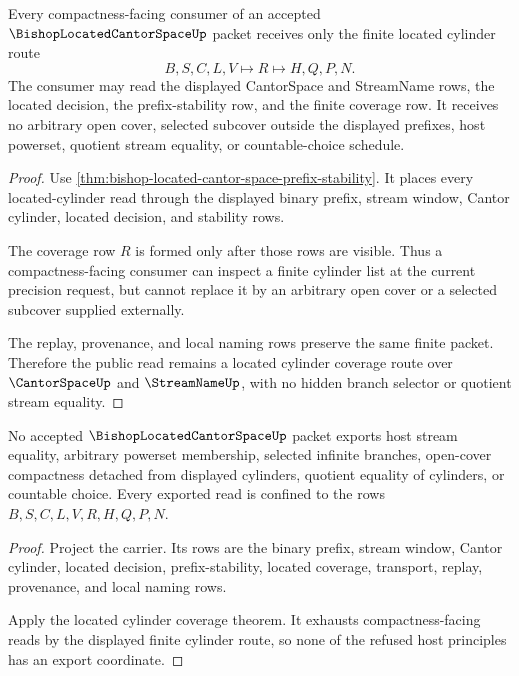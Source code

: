 \begin{theorem}
\label{thm:bishop-located-cantor-space-cylinder-coverage}
Every compactness-facing consumer of an accepted $\BishopLocatedCantorSpaceUp$ packet receives only the finite located cylinder route
$$
B,S,C,L,V \longmapsto R \longmapsto H,Q,P,N .
$$
The consumer may read the displayed CantorSpace and StreamName rows, the located decision, the prefix-stability row, and the finite coverage row. It receives no arbitrary open cover, selected subcover outside the displayed prefixes, host powerset, quotient stream equality, or countable-choice schedule.
\end{theorem}
\begin{proof}
Use \autoref{thm:bishop-located-cantor-space-prefix-stability}. It places every located-cylinder read through the displayed binary prefix, stream window, Cantor cylinder, located decision, and stability rows.

The coverage row $R$ is formed only after those rows are visible. Thus a compactness-facing consumer can inspect a finite cylinder list at the current precision request, but cannot replace it by an arbitrary open cover or a selected subcover supplied externally.

The replay, provenance, and local naming rows preserve the same finite packet. Therefore the public read remains a located cylinder coverage route over $\CantorSpaceUp$ and $\StreamNameUp$, with no hidden branch selector or quotient stream equality.
\end{proof}

\begin{theorem}
\label{thm:bishop-located-cantor-space-ledger-refusal}
No accepted $\BishopLocatedCantorSpaceUp$ packet exports host stream equality, arbitrary powerset membership, selected infinite branches, open-cover compactness detached from displayed cylinders, quotient equality of cylinders, or countable choice. Every exported read is confined to the rows $B,S,C,L,V,R,H,Q,P,N$.
\end{theorem}
\begin{proof}
Project the carrier. Its rows are the binary prefix, stream window, Cantor cylinder, located decision, prefix-stability, located coverage, transport, replay, provenance, and local naming rows.

Apply the located cylinder coverage theorem. It exhausts compactness-facing reads by the displayed finite cylinder route, so none of the refused host principles has an export coordinate.
\end{proof}

